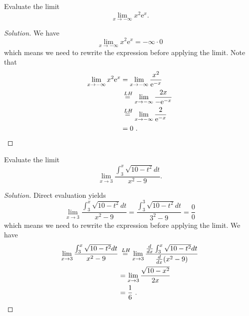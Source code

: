 \documentclass[compacto,10pt,comentarios]{aleph-notas}
\newcommand*\Heq{\ensuremath{\overset{\kern2pt LH}{=}}}
\begin{document}
\begin{ejer}
    Evaluate the limit
    $$
        \lim_{x \to -\infty} x^{2} \mathrm{e}^{x}.
    $$
\end{ejer}
\begin{proof}[Solution]
    We have
    $$
    \lim_{x \to -\infty} x^{2} \mathrm{e}^{x} = - \infty \cdot 0
    $$
    which means we need to rewrite the expression before applying the limit. Note that
    \begin{align*}
        \lim_{x \to -\infty} x^{2} \mathrm{e}^{x}
        & = \lim_{x \to -\infty} \frac{x^{2}}{\mathrm{e}^{-x}} \\
        & \Heq \lim_{x \to -\infty} \frac{2x}{-\mathrm{e}^{-x}} \\
        & \Heq \lim_{x \to -\infty} \frac{2}{\mathrm{e}^{-x}} \\
        & = 0 ~ .
    \end{align*}
\end{proof}

\begin{ejer}
    Evaluate the limit
    $$
        \lim_{x \to 3} \frac{\int_{3}^{x} \sqrt{10 - t^2} dt}{x^{2} - 9}.
    $$
\end{ejer}
\begin{proof}[Solution]
    Direct evaluation yields
    $$
    \lim_{x \to 3} \frac{\int_{3}^{x} \sqrt{10 - t^2} dt}{x^{2} - 9} 
    =  \frac{\int_{3}^{3} \sqrt{10 - t^2} dt}{3^{2} - 9} 
    = \frac{0}{0}
    $$
    which means we need to rewrite the expression before applying the limit. We have
    \begin{align*}
        \lim_{x \to 3} \frac{\int_{3}^{x} \sqrt{10 - t^2} dt}{x^{2} - 9} 
        & \Heq \lim_{x \to 3} \frac{\frac{d}{dx} \int_{3}^{x} \sqrt{10 - t^2} dt}{\frac{d}{dx} (x^{2} - 9)} \\
        & = \lim_{x \to 3} \frac{\sqrt{10 - x^2}}{2x} \\
        & = \frac{1}{6} ~ .
    \end{align*}
\end{proof}
\end{document}
